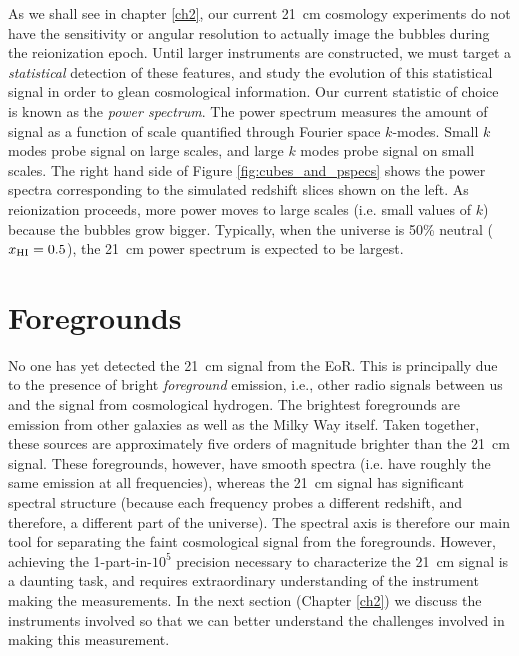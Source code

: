As we shall see in chapter \ref{ch2}, our current 21\ cm cosmology experiments do not have the
sensitivity or angular resolution to actually image the bubbles during the reionization
epoch.  Until larger instruments are constructed, we must target a \emph{statistical} detection of these
features, and study the evolution of this statistical signal in order to glean cosmological information.
Our current statistic of choice is known as the \emph{power spectrum}.  The power spectrum
measures the amount of signal as a function of scale quantified through Fourier space $k$-modes.
Small $k$ modes probe signal on large scales, and large $k$ modes probe signal on small scales.
The right hand side of Figure \ref{fig:cubes_and_pspecs} shows the power spectra corresponding to the
simulated redshift slices shown on the left.  As reionization proceeds, more power moves to large scales (i.e. small values
of $k$) because the bubbles grow bigger.  Typically, when the universe is 50\% neutral ($x_{\rm HI} = 0.5$), the
21\ cm power spectrum is expected to be largest.

\section{Foregrounds}

No one has yet detected the 21\ cm signal from the EoR.  This is principally due to the presence of bright
\emph{foreground} emission, i.e., other radio signals between us and the signal from cosmological hydrogen.
The brightest foregrounds are emission from other galaxies as well as the Milky Way itself.  Taken together, 
these sources are approximately five orders of magnitude brighter than the 21\ cm signal.  These foregrounds,
however, have smooth spectra (i.e. have roughly the same emission at all frequencies), whereas the 21\ cm signal
has significant spectral structure (because each frequency probes a different redshift, and therefore, a different
part of the universe).  The spectral axis is therefore our main tool for separating the faint
cosmological signal from the foregrounds.  However, achieving the 1-part-in-$10^5$ precision necessary to
characterize the 21\ cm signal is a daunting task, and requires extraordinary understanding of the instrument
making the measurements.  In the next section (Chapter \ref{ch2}) we discuss the instruments involved so that we
can better understand the challenges involved in making this measurement.
